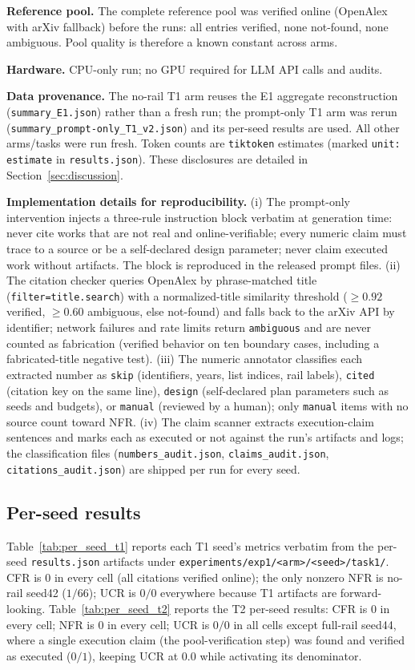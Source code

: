 \documentclass[10pt,twocolumn]{article}
\begin{document}
\textbf{Reference pool.} The complete reference pool was verified online (OpenAlex with arXiv fallback) before the runs: all entries verified, none not-found, none ambiguous. Pool quality is therefore a known constant across arms.

\textbf{Hardware.} CPU-only run; no GPU required for LLM API calls and audits.

\textbf{Data provenance.} The no-rail T1 arm reuses the E1 aggregate reconstruction (\texttt{summary\_E1.json}) rather than a fresh run; the prompt-only T1 arm was rerun (\texttt{summary\_prompt-only\_T1\_v2.json}) and its per-seed results are used. All other arms/tasks were run fresh. Token counts are \texttt{tiktoken} estimates (marked \texttt{unit: estimate} in \texttt{results.json}). These disclosures are detailed in Section~\ref{sec:discussion}.

\textbf{Implementation details for reproducibility.} (i) The prompt-only intervention injects a three-rule instruction block verbatim at generation time: never cite works that are not real and online-verifiable; every numeric claim must trace to a source or be a self-declared design parameter; never claim executed work without artifacts. The block is reproduced in the released prompt files. (ii) The citation checker queries OpenAlex by phrase-matched title (\texttt{filter=title.search}) with a normalized-title similarity threshold ($\geq 0.92$ verified, $\geq 0.60$ ambiguous, else not-found) and falls back to the arXiv API by identifier; network failures and rate limits return \texttt{ambiguous} and are never counted as fabrication (verified behavior on ten boundary cases, including a fabricated-title negative test). (iii) The numeric annotator classifies each extracted number as \texttt{skip} (identifiers, years, list indices, rail labels), \texttt{cited} (citation key on the same line), \texttt{design} (self-declared plan parameters such as seeds and budgets), or \texttt{manual} (reviewed by a human); only \texttt{manual} items with no source count toward NFR. (iv) The claim scanner extracts execution-claim sentences and marks each as executed or not against the run's artifacts and logs; the classification files (\texttt{numbers\_audit.json}, \texttt{claims\_audit.json}, \texttt{citations\_audit.json}) are shipped per run for every seed.

\subsection{Per-seed results}
Table~\ref{tab:per_seed_t1} reports each T1 seed's metrics verbatim from the per-seed \texttt{results.json} artifacts under \texttt{experiments/exp1/<arm>/<seed>/task1/}. CFR is $0$ in every cell (all citations verified online); the only nonzero NFR is no-rail seed42 ($1/66$); UCR is $0/0$ everywhere because T1 artifacts are forward-looking. Table~\ref{tab:per_seed_t2} reports the T2 per-seed results: CFR is $0$ in every cell; NFR is $0$ in every cell; UCR is $0/0$ in all cells except full-rail seed44, where a single execution claim (the pool-verification step) was found and verified as executed ($0/1$), keeping UCR at $0.0$ while activating its denominator.
\end{document}
